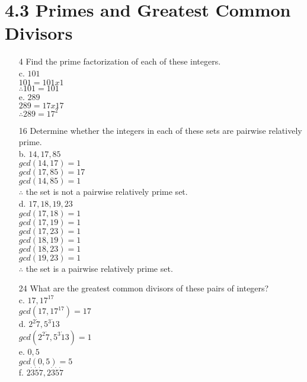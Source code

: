\documentclass[a4paper]{article}
\newcommand\tab[1][0.5cm]{\hspace*{#1}}
\begin{document}
  \section*{4.3 Primes and Greatest Common Divisors}
  \begin{itemize}
    \item[4] Find the prime factorization of each of these integers. \\
      c. $101$ \\
      \tab $101 = 101 x 1$ \\
      \tab $\therefore 101 = 101$ \\
      e. $289$ \\
      \tab $289 = 17 x 17$ \\
      \tab $\therefore 289 = 17^{2}$
    \item[16] Determine whether the integers in each of these sets are pairwise relatively prime. \\
      b. $14, 17, 85$ \\
      \tab $gcd(14, 17) = 1$ \\
      \tab $gcd(17, 85) = 17$ \\
      \tab $gcd(14, 85) = 1$ \\
      \tab $\therefore$ the set is not a pairwise relatively prime set. \\
      d. $17, 18, 19, 23$ \\
      \tab $gcd(17, 18) = 1$ \\
      \tab $gcd(17, 19) = 1$ \\
      \tab $gcd(17, 23) = 1$ \\
      \tab $gcd(18, 19) = 1$ \\
      \tab $gcd(18, 23) = 1$ \\
      \tab $gcd(19, 23) = 1$ \\
      \tab $\therefore$ the set is a pairwise relatively prime set. \\
    \item[24] What are the greatest common divisors of these pairs of integers? \\
      c. $17, 17^{17}$ \\
      \tab $gcd(17, 17^{17}) = 17$ \\
      d. $2^{2} \dot 7, 5^{3} \dot 13$ \\
      \tab $gcd(2^{2} \dot 7, 5^{3} \dot 13) = 1$ \\
      e. $0, 5$ \\
      \tab $gcd(0, 5) = 5$ \\
      f. $2 \dot 3 \dot 5 \dot 7, 2 \dot 3 \dot 5 \dot 7$ \\

\end{itemize}
\end{document}

